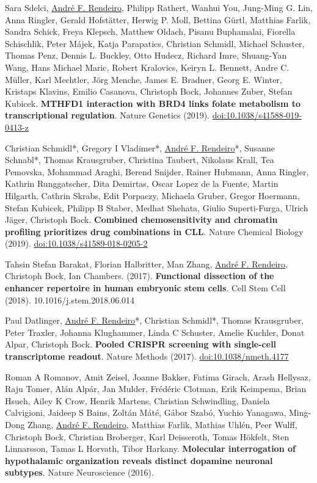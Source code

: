 \documentclass[11pt,a4paper,roman]{moderncv} %
\begin{document}
\begin{etaremune}[leftmargin=1.0cm, itemindent=0pt, topsep=10pt, itemsep=2pt, partopsep=0pt, parsep=0pt]
        \item Sara Sdelci, \underline{André F. Rendeiro}, Philipp Rathert, Wanhui You, Jung-Ming G. Lin, Anna Ringler, Gerald Hofstätter, Herwig P. Moll, Bettina Gürtl, Matthias Farlik, Sandra Schick, Freya Klepsch, Matthew Oldach, Pisanu Buphamalai, Fiorella Schischlik, Peter Májek, Katja Parapatics, Christian Schmidl, Michael Schuster, Thomas Penz, Dennis L. Buckley, Otto Hudecz, Richard Imre, Shuang-Yan Wang, Hans Michael Maric, Robert Kralovics, Keiryn L. Bennett, Andre C. Müller, Karl Mechtler, Jörg Menche, James E. Bradner, Georg E. Winter, Kristaps Klavins, Emilio Casanova, Christoph Bock, Johannes Zuber, Stefan Kubicek. \textbf{MTHFD1 interaction with BRD4 links folate metabolism to transcriptional regulation}. Nature Genetics (2019).
        \href{https://dx.doi.org/10.1038/s41588-019-0413-z}{doi:10.1038/s41588-019-0413-z}
        \item Christian Schmidl*, Gregory I Vladimer*, \underline{André F. Rendeiro}*, Susanne Schnabl*, Thomas Krausgruber, Christina Taubert, Nikolaus Krall, Tea Pemovska, Mohammad Araghi, Berend Snijder, Rainer Hubmann, Anna Ringler, Kathrin Runggatscher, Dita Demirtas, Oscar Lopez de la Fuente, Martin Hilgarth, Cathrin Skrabs, Edit Porpaczy, Michaela Gruber, Gregor Hoermann, Stefan Kubicek, Philipp B Staber, Medhat Shehata, Giulio Superti-Furga, Ulrich Jäger, Christoph Bock. \textbf{Combined chemosensitivity and chromatin profiling prioritizes drug combinations in CLL}. Nature Chemical Biology (2019).
        \href{https://dx.doi.org/10.1038/s41589-018-0205-2}{doi:10.1038/s41589-018-0205-2}
        \item Tahsin Stefan Barakat, Florian Halbritter, Man Zhang, \underline{André F. Rendeiro}, Christoph Bock, Ian Chambers. (2017). \textbf{Functional dissection of the enhancer repertoire in human embryonic stem cells}. Cell Stem Cell (2018). 10.1016/j.stem.2018.06.014
        \item Paul Datlinger, \underline{André F. Rendeiro}*, Christian Schmidl*, Thomas Krausgruber, Peter Traxler, Johanna Klughammer, Linda C Schuster, Amelie Kuchler, Donat Alpar, Christoph Bock. \textbf{Pooled CRISPR screening with single-cell transcriptome readout}. Nature Methods (2017).
        \href{https://dx.doi.org/10.1038/nmeth.4177}{doi:10.1038/nmeth.4177}
        \item Roman A Romanov, Amit Zeisel, Joanne Bakker, Fatima Girach, Arash Hellysaz, Raju Tomer, Alán Alpár, Jan Mulder, Frédéric Clotman, Erik Keimpema, Brian Hsueh, Ailey K Crow, Henrik Martens, Christian Schwindling, Daniela Calvigioni, Jaideep S Bains, Zoltán Máté, Gábor Szabó, Yuchio Yanagawa, Ming-Dong Zhang, \underline{André F. Rendeiro}, Matthias Farlik, Mathias Uhlén, Peer Wulff, Christoph Bock, Christian Broberger, Karl Deisseroth, Tomas Hökfelt, Sten Linnarsson, Tamas L Horvath, Tibor Harkany. \textbf{Molecular interrogation of hypothalamic organization reveals distinct dopamine neuronal subtypes}. Nature Neuroscience (2016).

\end{etaremune}
\end{document}
